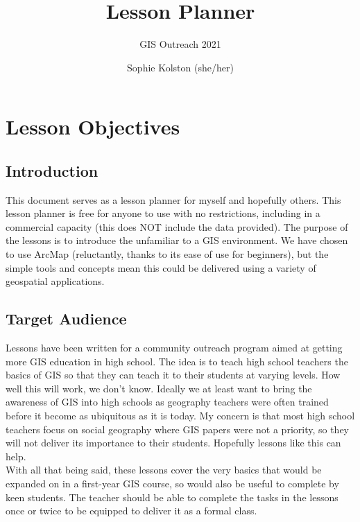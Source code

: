 \documentclass{article}
\title{Lesson Planner}
\author{GIS Outreach 2021}
\date{Sophie Kolston (she/her)}
\begin{document}
\maketitle

\tableofcontents

\setlength{\parindent}{0in} 


\section{Lesson Objectives}
\subsection{Introduction}
This document serves as a lesson planner for myself and hopefully others. This lesson planner is free for anyone to use with no restrictions, including in a commercial capacity (this does NOT include the data provided). The purpose of the lessons is to introduce the unfamiliar to a GIS environment. We have chosen to use ArcMap (reluctantly, thanks to its ease of use for beginners), but the simple tools and concepts mean this could be delivered using a variety of geospatial applications.

\subsection{Target Audience}
Lessons have been written for a community outreach program aimed at getting more GIS education in high school. The idea is to teach high school teachers the basics of GIS so that they can teach it to their students at varying levels. How well this will work, we don't know. Ideally we at least want to bring the awareness of GIS into high schools as geography teachers were often trained before it become as ubiquitous as it is today. My concern is that most high school teachers focus on social geography where GIS papers were not a priority, so they will not deliver its importance to their students. Hopefully lessons like this can help. \\

With all that being said, these lessons cover the very basics that would be expanded on in a first-year GIS course, so would also be useful to complete by keen students. The teacher should be able to complete the tasks in the lessons once or twice to be equipped to deliver it as a formal class.
\end{document}
